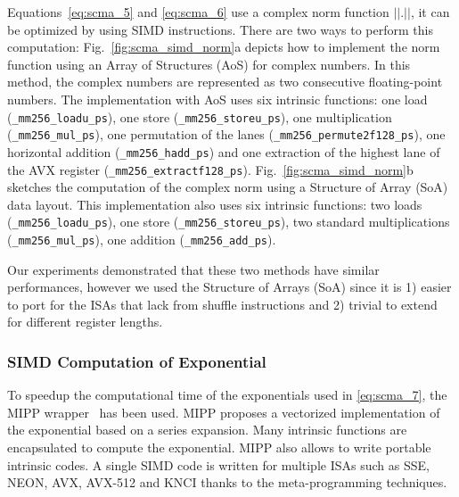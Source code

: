 Equations~\eqref{eq:scma_5} and \eqref{eq:scma_6} use a complex norm function
$||.||$, it can be optimized by using SIMD instructions. There are two ways to
perform this computation: Fig.~\ref{fig:scma_simd_norm}a depicts how to
implement the norm function using an Array of Structures (AoS) for complex
numbers. In this method, the complex numbers are represented as two consecutive
floating-point numbers. The implementation with AoS uses six intrinsic
functions: one load (\verb|_mm256_loadu_ps|), one store
(\verb|_mm256_storeu_ps|), one multiplication (\verb|_mm256_mul_ps|), one
permutation of the lanes (\verb|_mm256_permute2f128_ps|), one horizontal
addition (\verb|_mm256_hadd_ps|) and one extraction of the highest lane of the
AVX register (\verb|_mm256_extractf128_ps|). Fig.~\ref{fig:scma_simd_norm}b
sketches the computation of the complex norm using a Structure of Array (SoA)
data layout. This implementation also uses six intrinsic functions: two loads
(\verb|_mm256_loadu_ps|), one store (\verb|_mm256_storeu_ps|), two standard
multiplications (\verb|_mm256_mul_ps|), one addition (\verb|_mm256_add_ps|).

Our experiments demonstrated that these two methods have similar performances,
however we used the Structure of Arrays (SoA) since it is 1) easier to port for
the ISAs that lack from shuffle instructions and 2) trivial to extend for
different register lengths.

\subsubsection{SIMD Computation of Exponential}

To speedup the computational time of the exponentials used in \eqref{eq:scma_7},
the MIPP wrapper~\cite{Cassagne2018} has been used. MIPP proposes a vectorized
implementation of the exponential based on a series expansion. Many intrinsic
functions are encapsulated to compute the exponential. MIPP also allows to write
portable intrinsic codes. A single SIMD code is written for multiple ISAs such
as SSE, NEON, AVX, AVX-512 and KNCI thanks to the meta-programming techniques.

